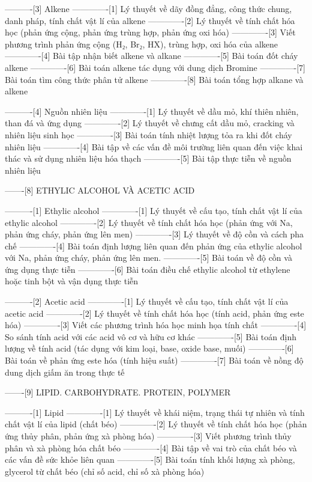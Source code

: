----------[3] Alkene
-------------[1] Lý thuyết về dãy đồng đẳng, công thức chung, danh pháp, tính chất vật lí của alkene
-------------[2] Lý thuyết về tính chất hóa học (phản ứng cộng, phản ứng trùng hợp, phản ứng oxi hóa)
-------------[3] Viết phương trình phản ứng cộng (H₂, Br₂, HX), trùng hợp, oxi hóa của alkene
-------------[4] Bài tập nhận biết alkene và alkane
-------------[5] Bài toán đốt cháy alkene
-------------[6] Bài toán alkene tác dụng với dung dịch Bromine
-------------[7] Bài toán tìm công thức phân tử alkene
-------------[8] Bài toán tổng hợp alkane và alkene

----------[4] Nguồn nhiên liệu
-------------[1] Lý thuyết về dầu mỏ, khí thiên nhiên, than đá và ứng dụng
-------------[2] Lý thuyết về chưng cất dầu mỏ, cracking và nhiên liệu sinh học
-------------[3] Bài toán tính nhiệt lượng tỏa ra khi đốt cháy nhiên liệu
-------------[4] Bài tập về các vấn đề môi trường liên quan đến việc khai thác và sử dụng nhiên liệu hóa thạch
-------------[5] Bài tập thực tiễn về nguồn nhiên liệu

-------[8] ETHYLIC ALCOHOL VÀ ACETIC ACID

----------[1] Ethylic alcohol
-------------[1] Lý thuyết về cấu tạo, tính chất vật lí của ethylic alcohol
-------------[2] Lý thuyết về tính chất hóa học (phản ứng với Na, phản ứng cháy, phản ứng lên men)
-------------[3] Lý thuyết về độ cồn và cách pha chế
-------------[4] Bài toán định lượng liên quan đến phản ứng của ethylic alcohol với Na, phản ứng cháy, phản ứng lên men.
-------------[5] Bài toán về độ cồn và ứng dụng thực tiễn
-------------[6] Bài toán điều chế ethylic alcohol từ ethylene hoặc tinh bột và vận dụng thực tiễn

----------[2] Acetic acid
-------------[1] Lý thuyết về cấu tạo, tính chất vật lí của acetic acid
-------------[2] Lý thuyết về tính chất hóa học (tính acid, phản ứng este hóa)
-------------[3] Viết các phương trình hóa học minh họa tính chất
-------------[4] So sánh tính acid với các acid vô cơ và hữu cơ khác
-------------[5] Bài toán định lượng về tính acid (tác dụng với kim loại, base, oxide base, muối)
-------------[6] Bài toán về phản ứng este hóa (tính hiệu suất)
-------------[7] Bài toán về nồng độ dung dịch giấm ăn trong thực tế

-------[9] LIPID. CARBOHYDRATE. PROTEIN, POLYMER

----------[1] Lipid
-------------[1] Lý thuyết về khái niệm, trạng thái tự nhiên và tính chất vật lí của lipid (chất béo)
-------------[2] Lý thuyết về tính chất hóa học (phản ứng thủy phân, phản ứng xà phòng hóa)
-------------[3] Viết phương trình thủy phân và xà phòng hóa chất béo
-------------[4] Bài tập về vai trò của chất béo và các vấn đề sức khỏe liên quan
-------------[5] Bài toán tính khối lượng xà phòng, glycerol từ chất béo (chỉ số acid, chỉ số xà phòng hóa)

